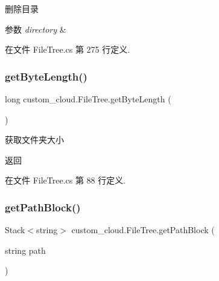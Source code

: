 删除目录 


\begin{DoxyParams}{参数}
{\em directory} & \\
\hline
\end{DoxyParams}


在文件 File\+Tree.\+cs 第 275 行定义.

\mbox{\label{classcustom__cloud_1_1_file_tree_aac5bb07be6a4f8b47c66cc5670384b10}} 
\subsubsection{\texorpdfstring{get\+Byte\+Length()}{getByteLength()}}
{\footnotesize\ttfamily long custom\+\_\+cloud.\+File\+Tree.\+get\+Byte\+Length (\begin{DoxyParamCaption}{ }\end{DoxyParamCaption})}



获取文件夹大小 

\begin{DoxyReturn}{返回}

\end{DoxyReturn}


在文件 File\+Tree.\+cs 第 88 行定义.

\mbox{\label{classcustom__cloud_1_1_file_tree_a7c6226e3837b7aba681b49cb3d104fad}} 
\subsubsection{\texorpdfstring{get\+Path\+Block()}{getPathBlock()}}
{\footnotesize\ttfamily Stack$<$string$>$ custom\+\_\+cloud.\+File\+Tree.\+get\+Path\+Block (\begin{DoxyParamCaption}\item[{string}]{path }\end{DoxyParamCaption})}



